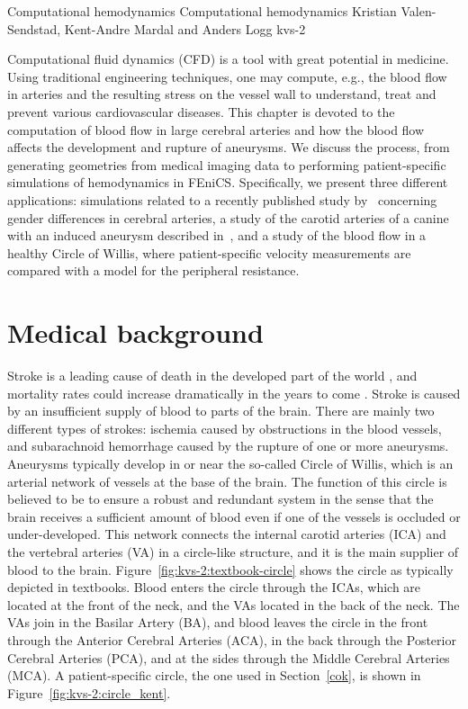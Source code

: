              {Computational hemodynamics}
              {Computational hemodynamics}
              {Kristian Valen-Sendstad, Kent-Andre Mardal and Anders Logg}
              {kvs-2}

Computational fluid dynamics (CFD) is a tool with great potential in
medicine. Using traditional engineering techniques, one may compute,
e.g., the blood flow in arteries and the resulting stress on the
vessel wall to understand, treat and prevent various cardiovascular
diseases. This chapter is devoted to the computation of blood flow in
large cerebral arteries and how the blood flow affects the development
and rupture of aneurysms. We discuss the process, from generating
geometries from medical imaging data to performing patient-specific
simulations of hemodynamics in FEniCS. Specifically, we present three
different applications: simulations related to a recently published
study by~\citet{LindekleivValen-SendstadMorganEtAl2010} concerning
gender differences in cerebral arteries, a study of the carotid
arteries of a canine with an induced aneurysm described
in~\citet{JiangJohnsonValen-SendstadEtAl2010}, and a study of the
blood flow in a healthy Circle of Willis, where patient-specific
velocity measurements are compared with a model for the peripheral
resistance.

\section{Medical background} \label{Medical_Background}

Stroke is a leading cause of death in the developed part of the
world \citep{Feigin2005}, and mortality rates could increase
dramatically in the years to come \citep{MurrayLopez1997}. Stroke is
caused by an insufficient supply of blood to parts of the brain. There
are mainly two different types of strokes: ischemia caused by
obstructions in the blood vessels, and subarachnoid hemorrhage caused
by the rupture of one or more aneurysms. Aneurysms typically develop
in or near the so-called Circle of Willis, which is an arterial
network of vessels at the base of the brain. The function of this
circle is believed to be to ensure a robust and redundant system in
the sense that the brain receives a sufficient amount of blood even if
one of the vessels is occluded or under-developed. This network
connects the internal carotid arteries (ICA) and the vertebral
arteries (VA) in a circle-like structure, and it is the main
supplier of blood to the brain. Figure~\ref{fig:kvs-2:textbook-circle}
shows the circle as typically depicted in textbooks. Blood enters the
circle through the ICAs, which are located at the front of the neck,
and the VAs located in the back of the neck.  The VAs join in the
Basilar Artery (BA), and blood leaves the circle in the front through
the Anterior Cerebral Arteries (ACA), in the back through the
Posterior Cerebral Arteries (PCA), and at the sides through the Middle
Cerebral Arteries (MCA). A patient-specific circle, the one used in
Section~\ref{cok}, is shown in Figure~\ref{fig:kvs-2:circle_kent}.

